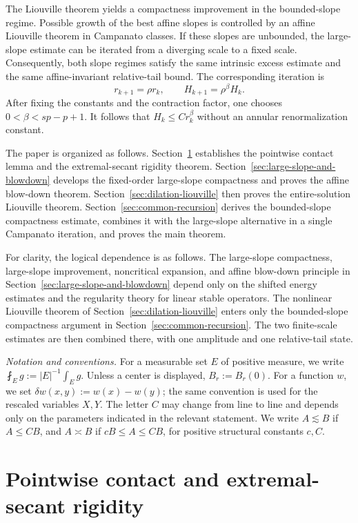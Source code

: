 \documentclass[11pt,reqno]{amsart}
\numberwithin{equation}{section}
\theoremstyle{remark}
\begin{document}
The Liouville theorem yields a compactness improvement in the
bounded-slope regime.  Possible growth of the best affine slopes is
controlled by an affine Liouville theorem in Campanato classes.  If these
slopes are unbounded, the large-slope estimate can be iterated from a
diverging scale to a fixed scale.  Consequently, both slope regimes
satisfy the same intrinsic excess estimate and the same affine-invariant
relative-tail bound.  The corresponding iteration is
\[
 r_{k+1}=\rho r_k,\qquad
 H_{k+1}=\rho^\beta H_k.
\]
After fixing the constants and the contraction factor, one chooses
\(0<\beta<sp-p+1\).  It follows that \(H_k\le Cr_k^\beta\) without an
annular renormalization constant.

The paper is organized as follows.
Section~\ref{sec:setting-contact} establishes the pointwise contact
lemma and the extremal-secant rigidity theorem.
Section~\ref{sec:large-slope-and-blowdown} develops the fixed-order
large-slope compactness and proves the affine blow-down theorem.
Section~\ref{sec:dilation-liouville} then proves the entire-solution
Liouville theorem.  Section~\ref{sec:common-recursion} derives the
bounded-slope compactness estimate, combines it with the large-slope
alternative in a single Campanato iteration, and proves the main theorem.

For clarity, the logical dependence is as follows.  The large-slope
compactness, large-slope improvement, noncritical expansion, and affine
blow-down principle in Section~\ref{sec:large-slope-and-blowdown}
depend only on the shifted energy estimates and the regularity theory
for linear stable operators.  The nonlinear Liouville theorem of
Section~\ref{sec:dilation-liouville} enters only the bounded-slope
compactness argument in Section~\ref{sec:common-recursion}.  The two
finite-scale estimates are then combined there, with one amplitude and
one relative-tail state.

\medskip
\noindent\textit{Notation and conventions.}
For a measurable set \(E\) of positive measure, we write
\(\fint_E g:=|E|^{-1}\int_E g\).  Unless a center is displayed,
\(B_r:=B_r(0)\).  For a function \(w\), we set
\(\delta w(x,y):=w(x)-w(y)\); the same convention is used for the
rescaled variables \(X,Y\).  The letter \(C\) may change from line to
line and depends only on the parameters indicated in the relevant
statement.  We write \(A\lesssim B\) if \(A\le CB\), and
\(A\asymp B\) if \(cB\le A\le CB\), for positive structural constants
\(c,C\).

\section{Pointwise contact and extremal-secant rigidity}
\label{sec:setting-contact}
\end{document}
